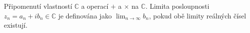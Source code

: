 Připomenutí vlastností $\mathbb{C}$ a operací $+$ a $\times$ na $\mathbb{C}$. Limita posloupnosti $z_n = a_n + i b_n \in \mathbb{C}$ je definována jako $\lim_{n \rightarrow \infty} b_n$, pokud obě limity reálných čísel existují.